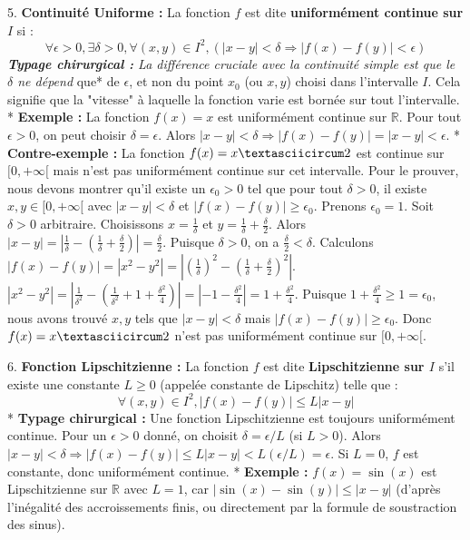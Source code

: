 \documentclass[12pt,a4paper]{report}
\begin{document}
5.  \textbf{Continuité Uniforme :}
    La fonction $f$ est dite \textbf{uniformément continue sur $I$} si :
    $$\forall \epsilon > 0, \exists \delta > 0, \forall (x, y) \in I^2, (|x - y| < \delta \Rightarrow |f(x) - f(y)| < \epsilon)$$
    \textit{   \textbf{Typage chirurgical :} La différence cruciale avec la continuité simple est que le $\delta$ ne dépend }que* de $\epsilon$, et non du point $x_0$ (ou $x, y$) choisi dans l'intervalle $I$. Cela signifie que la "vitesse" à laquelle la fonction varie est bornée sur tout l'intervalle.
    *   \textbf{Exemple :} La fonction $f(x) = x$ est uniformément continue sur $\mathbb{R}$. Pour tout $\epsilon > 0$, on peut choisir $\delta = \epsilon$. Alors $|x-y| < \delta \Rightarrow |f(x)-f(y)| = |x-y| < \epsilon$.
    *   \textbf{Contre-exemple :} La fonction $f(x) = x\textasciicircum 2$ est continue sur $[0, +\infty[$ mais n'est pas uniformément continue sur cet intervalle.
        Pour le prouver, nous devons montrer qu'il existe un $\epsilon_0 > 0$ tel que pour tout $\delta > 0$, il existe $x, y \in [0, +\infty[$ avec $|x-y| < \delta$ et $|f(x)-f(y)| \ge \epsilon_0$.
        Prenons $\epsilon_0 = 1$. Soit $\delta > 0$ arbitraire.
        Choisissons $x = \frac{1}{\delta}$ et $y = \frac{1}{\delta} + \frac{\delta}{2}$.
        Alors $|x-y| = \left|\frac{1}{\delta} - \left(\frac{1}{\delta} + \frac{\delta}{2}\right)\right| = \frac{\delta}{2}$. Puisque $\delta > 0$, on a $\frac{\delta}{2} < \delta$.
        Calculons $|f(x)-f(y)| = |x^2 - y^2| = \left|\left(\frac{1}{\delta}\right)^2 - \left(\frac{1}{\delta} + \frac{\delta}{2}\right)^2\right|$.
        $|x^2 - y^2| = \left|\frac{1}{\delta^2} - \left(\frac{1}{\delta^2} + 1 + \frac{\delta^2}{4}\right)\right| = \left|-1 - \frac{\delta^2}{4}\right| = 1 + \frac{\delta^2}{4}$.
        Puisque $1 + \frac{\delta^2}{4} \ge 1 = \epsilon_0$, nous avons trouvé $x, y$ tels que $|x-y| < \delta$ mais $|f(x)-f(y)| \ge \epsilon_0$.
        Donc $f(x) = x\textasciicircum 2$ n'est pas uniformément continue sur $[0, +\infty[$.

6.  \textbf{Fonction Lipschitzienne :}
    La fonction $f$ est dite \textbf{Lipschitzienne sur $I$} s'il existe une constante $L \ge 0$ (appelée constante de Lipschitz) telle que :
    $$\forall (x, y) \in I^2, |f(x) - f(y)| \le L|x - y|$$
    *   \textbf{Typage chirurgical :} Une fonction Lipschitzienne est toujours uniformément continue. Pour un $\epsilon > 0$ donné, on choisit $\delta = \epsilon/L$ (si $L>0$). Alors $|x-y| < \delta \Rightarrow |f(x)-f(y)| \le L|x-y| < L(\epsilon/L) = \epsilon$. Si $L=0$, $f$ est constante, donc uniformément continue.
    *   \textbf{Exemple :} $f(x) = \sin(x)$ est Lipschitzienne sur $\mathbb{R}$ avec $L=1$, car $|\sin(x) - \sin(y)| \le |x-y|$ (d'après l'inégalité des accroissements finis, ou directement par la formule de soustraction des sinus).
\end{document}
